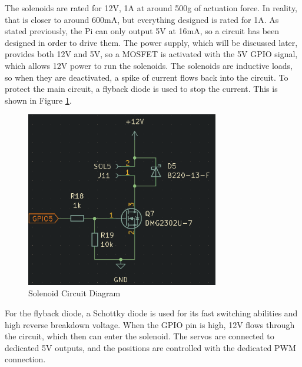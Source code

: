 \documentclass[UTF8, 12pt]{article}
\begin{document}
    The solenoids are rated for 12V, 1A at around 500g of actuation force. In reality, that is closer to around 600mA, but everything designed is rated for 1A. As stated previously, the Pi can only output 5V at 16mA, so a circuit has been designed in order to drive them. The power supply, which will be discussed later, provides both 12V and 5V, so a MOSFET is activated with the 5V GPIO signal, which allows 12V power to run the solenoids. The solenoids are inductive loads, so when they are deactivated, a spike of current flows back into the circuit. To protect the main circuit, a flyback diode is used to stop the current. This is shown in Figure \ref{sol_ckt}.
    \begin{figure}[h]
        \centering
        \includegraphics[width=0.75\textwidth]{solenoid_ckt.png}
        \caption{Solenoid Circuit Diagram}
        \label{sol_ckt}
    \end{figure}
    For the flyback diode, a Schottky diode is used for its fast switching abilities and high reverse breakdown voltage. When the GPIO pin is high, 12V flows through the circuit, which then can enter the solenoid. The servos are connected to dedicated 5V outputs, and the positions are controlled with the dedicated PWM connection.
\end{document}
